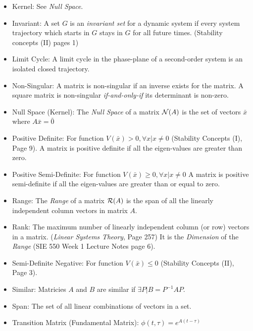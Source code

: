 \documentclass[12pt]{article}
\begin{document}
\begin{itemize}
\item Kernel: See { \em Null Space}.

\item Invariant: A set $G$ is an {\em invariant set} for a dynamic system if every system trajectory which starts in $G$ stays in $G$ for all future times. (Stability concepts (II) pages 1)

\item Limit Cycle: A limit cycle in the phase-plane of a second-order system is an isolated closed trajectory. 

\item Non-Singular: A matrix is non-singular if an inverse exists for the matrix. A square matrix is non-singular {\em if-and-only-if} its determinant is non-zero.

\item Null Space (Kernel): The {\em Null Space} of a matrix ${\cal N}(A)$ is the set of vectors $\bar{x}$ where $A\bar{x}=\bar{0}$

\item Positive Definite: For function $V(\bar{x})>0, \forall x | x\neq0$ (Stability Concepts (I), Page 9). A matrix is positive definite if all the eigen-values are greater than zero. 

\item Positive Semi-Definite: For function $V(\bar{x})\geq0, \forall x | x\neq0$ A matrix is positive semi-definite if all the eigen-values are greater than or equal to zero. 

\item Range: The {\em Range} of a matrix ${\cal R}(A)$ is the span of all the linearly independent column vectors in matrix $A$.

\item Rank: The maximum number of linearly independent column (or row) vectors in a matrix. ({\em Linear Systems Theory}, Page 257) It is the { \em Dimension} of the {\em Range} (SIE 550 Week 1 Lecture Notes page 6).

\item Semi-Definite Negative: For function $V(\bar{x})\leq0$ (Stability Concepts (II), Page 3). 

\item Similar: Matricies $A$ and $B$ are similar if $\exists P | B=P^{-1}AP$.

\item Span: The set of all linear combinations of vectors in a set. 

\item Transition Matrix (Fundamental Matrix): $\phi(t,\tau)=e^{A(t-\tau)}$

\end{itemize}
\end{document}
